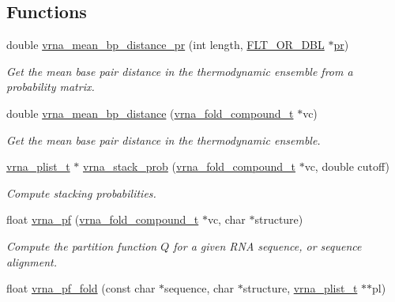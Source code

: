 \subsection*{Functions}
\begin{DoxyCompactItemize}
\item 
double \hyperlink{group__pf__fold_gad3f0c240512e6d43e2e4d4c2076021f5}{vrna\+\_\+mean\+\_\+bp\+\_\+distance\+\_\+pr} (int length, \hyperlink{group__data__structures_ga31125aeace516926bf7f251f759b6126}{F\+L\+T\+\_\+\+O\+R\+\_\+\+D\+BL} $\ast$\hyperlink{fold__vars_8h_ac98ec419070aee6831b44e5c700f090f}{pr})
\begin{DoxyCompactList}\small\item\em Get the mean base pair distance in the thermodynamic ensemble from a probability matrix. \end{DoxyCompactList}\item 
double \hyperlink{group__pf__fold_gaa6b8983b559b9ef4b2e1b31113ea317b}{vrna\+\_\+mean\+\_\+bp\+\_\+distance} (\hyperlink{group__fold__compound_ga1b0cef17fd40466cef5968eaeeff6166}{vrna\+\_\+fold\+\_\+compound\+\_\+t} $\ast$vc)
\begin{DoxyCompactList}\small\item\em Get the mean base pair distance in the thermodynamic ensemble. \end{DoxyCompactList}\item 
\hyperlink{group__data__structures_ga8e4eb5e1bfc95776559575beb359af87}{vrna\+\_\+plist\+\_\+t} $\ast$ \hyperlink{group__pf__fold_ga26e3cc2eb127a35625572e9275c24ee4}{vrna\+\_\+stack\+\_\+prob} (\hyperlink{group__fold__compound_ga1b0cef17fd40466cef5968eaeeff6166}{vrna\+\_\+fold\+\_\+compound\+\_\+t} $\ast$vc, double cutoff)
\begin{DoxyCompactList}\small\item\em Compute stacking probabilities. \end{DoxyCompactList}\item 
float \hyperlink{group__pf__fold_ga29e256d688ad221b78d37f427e0e99bc}{vrna\+\_\+pf} (\hyperlink{group__fold__compound_ga1b0cef17fd40466cef5968eaeeff6166}{vrna\+\_\+fold\+\_\+compound\+\_\+t} $\ast$vc, char $\ast$structure)
\begin{DoxyCompactList}\small\item\em Compute the partition function $Q$ for a given R\+NA sequence, or sequence alignment. \end{DoxyCompactList}\item 
float \hyperlink{group__pf__fold_gafe8f523e16575e6e61bf8ff909663b5f}{vrna\+\_\+pf\+\_\+fold} (const char $\ast$sequence, char $\ast$structure, \hyperlink{group__data__structures_ga8e4eb5e1bfc95776559575beb359af87}{vrna\+\_\+plist\+\_\+t} $\ast$$\ast$pl)
$$
\end{DoxyCompactItemize}
